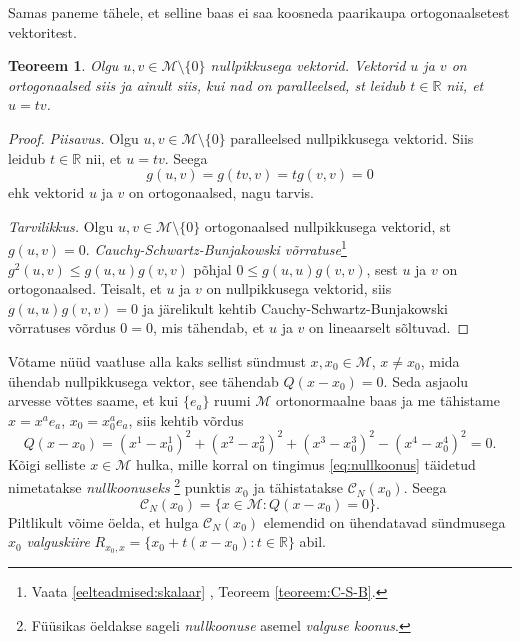 \documentclass[12pt]{article}
\theoremstyle{plain}
\newtheorem{teoreem}{Teoreem}[section]
\theoremstyle{definition}
\numberwithin{equation}{section}
\def\R{{\mathbb R}}
\def\M{{\mathcal M}}
\begin{document}
Samas paneme tähele, et selline baas ei saa koosneda paarikaupa 
ortogonaalsetest vektoritest.
\begin{teoreem}
Olgu $u, v \in \M \setminus \{0\}$ nullpikkusega vektorid. Vektorid 
$u$ ja $v$ on ortogonaalsed siis ja ainult siis, kui nad on 
paralleelsed, st leidub $t \in \R$ nii, et $u = tv$.
\end{teoreem}
\begin{proof}
\emph{Piisavus.} Olgu $u, v \in \M \setminus \{0\}$ paralleelsed 
nullpikkusega vektorid. Siis leidub $t \in \R$ nii, et $u = tv$. 
Seega
\[g\left(u, v\right) = g \left(tv, v\right) = 
t g \left(v, v\right) = 0\]
ehk vektorid $u$ ja $v$ on ortogonaalsed, nagu tarvis.

\emph{Tarvilikkus.} Olgu $u, v \in \M \setminus \{0\}$ ortogonaalsed 
nullpikkusega vektorid, st $g \left(u, v\right) = 0$. 
\emph{Cauchy-Schwartz-Bunjakowski võrratuse}\footnote{Vaata 
\ref{eelteadmised:skalaar} , Teoreem 
\ref{teoreem:C-S-B}.} $g^2 \left(u, v \right) \leq 
g \left(u, u \right) g \left(v, v \right)$ põhjal 
$0 \leq g \left(u, u \right) g \left(v, v \right)$, sest $u$ ja $v$ 
on ortogonaalsed. Teisalt, et $u$ ja $v$ on nullpikkusega vektorid, 
siis $g \left(u, u \right) g \left(v, v \right) = 0$ ja järelikult 
kehtib Cauchy-Schwartz-Bunjakowski võrratuses võrdus $0 = 0$, mis 
tähendab, et $u$ ja $v$ on lineaarselt sõltuvad.
\end{proof}

Võtame nüüd vaatluse alla kaks sellist sündmust $x, x_0 \in \M$, 
$x \neq x_0$, mida ühendab nullpikkusega vektor, see tähendab 
$Q \left(x- x_0\right) = 0$. Seda asjaolu arvesse võttes saame, 
et kui $\{e_a\}$ ruumi $\M$ ortonormaalne baas ja me tähistame 
$x = x^a e_a$, $x_0 = x_0^a e_a$, siis kehtib võrdus
\begin{equation} \label{eq:nullkoonus}
Q \left(x - x_0\right) = \left(x^1 - x_0^1\right)^2 + 
\left(x^2 - x_0^2\right)^2 + \left(x^3 - x_0^3\right)^2 - 
\left(x^4 - x_0^4\right)^2 = 0.
\end{equation}
Kõigi selliste $x \in \M$ hulka, mille korral on tingimus 
\ref{eq:nullkoonus} täidetud nimetatakse \emph{nullkoonuseks}
\footnote{Füüsikas öeldakse sageli \emph{nullkoonuse} asemel 
\emph{valguse koonus}.} punktis $x_0$ ja tähistatakse 
$\mathcal{C}_N\left(x_0\right)$. Seega 
\[\mathcal{C}_N\left(x_0\right) = \{x \in \M : Q \left(x- x_0\right) 
= 0 \}.\]
Piltlikult võime öelda, et hulga $\mathcal{C}_N\left(x_0\right)$ 
elemendid on ühendatavad sündmusega $x_0$ \emph{valguskiire} 
$R_{x_0, x} = \{x_0 + t\left(x - x_0\right) : t \in \R \}$ abil.
\end{document}
